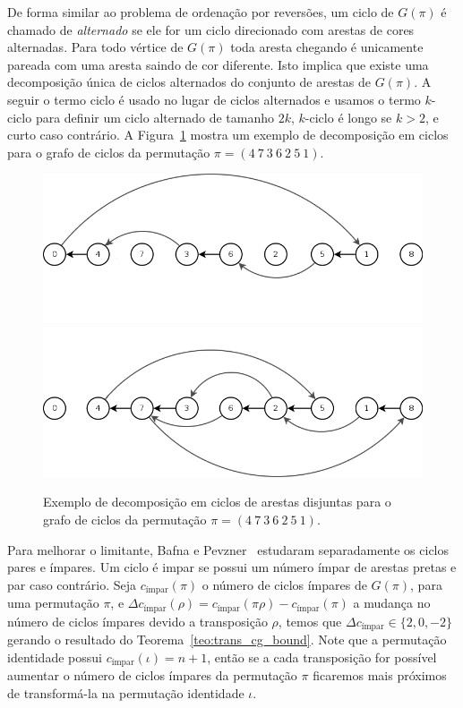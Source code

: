 De forma similar ao problema de ordenação por reversões, um ciclo de
$G(\pi)$ é chamado de \textit{alternado} se ele for um ciclo direcionado
com arestas de cores alternadas. Para todo vértice de $G(\pi)$ toda
aresta chegando é unicamente pareada com uma aresta saindo de cor
diferente. Isto implica que existe uma decomposição única de ciclos
alternados do conjunto de arestas de $G(\pi)$. A seguir o termo ciclo é
usado no lugar de ciclos alternados e usamos o termo $k$-ciclo para
definir um ciclo alternado de tamanho $2k$, $k$-ciclo é longo se $k >
2$, e curto caso contrário. A Figura~\ref{fig:tra_grafo_bkp_dec} mostra
um exemplo de decomposição em ciclos para o grafo de ciclos da
permutação $\pi = (4~7~3~6~2~5~1)$.

\begin{figure}[h]
  \centering 
  \includegraphics[scale=0.6]{images/trans_cycle_graph_dec-1.png}
  \includegraphics[scale=0.6]{images/trans_cycle_graph_dec-2.png} 
  \caption{Exemplo de decomposição em ciclos de arestas disjuntas para
  o grafo de ciclos da permutação $\pi = (4~7~3~6~2~5~1)$.}
  \label{fig:tra_grafo_bkp_dec}
\end{figure}

Para melhorar o limitante, Bafna e Pevzner~\cite{BafnaPevzner*1998}
estudaram separadamente os ciclos pares e ímpares. Um ciclo é impar se
possui um número ímpar de arestas pretas e par caso contrário. Seja
$c_{\text{ímpar}}(\pi)$ o número de ciclos ímpares de $G(\pi)$, para uma
permutação $\pi$, e $\Delta c_{\text{ímpar}} (\rho) = c_{\text{ímpar}}
(\pi \rho) - c_{\text{ímpar}} (\pi)$ a mudança no número de ciclos
ímpares devido a transposição $\rho$, temos que $\Delta c_{\text{ímpar}}
\in \{2, 0, -2\}$ gerando o resultado do
Teorema~\ref{teo:trans_cg_bound}. Note que a permutação identidade
possui $c_{\text{ímpar}}(\iota) = n + 1$, então se a cada transposição
for possível aumentar o número de ciclos ímpares da permutação $\pi$
ficaremos mais próximos de transformá-la na permutação identidade
$\iota$.

